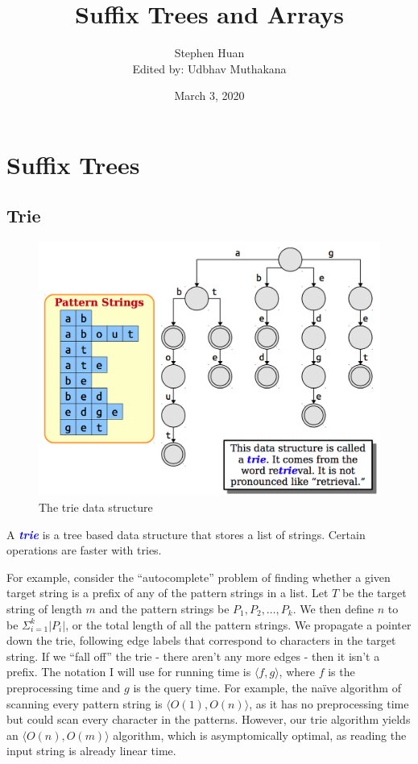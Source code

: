 \documentclass[11pt, oneside]{article}
\title{Suffix Trees and Arrays}
\author{Stephen Huan \\ Edited by: Udbhav Muthakana}
\date{March 3, 2020}
\newcommand{\emphasis}[1]{\textcolor{blue}{\textbf{\textit{#1}}}}
\begin{document}
\maketitle

\section{Suffix Trees}
\subsection{Trie}

\begin{figure}[h!]
\centering
\includegraphics[scale=0.25]{trie}
\caption{The trie data structure}
\end{figure}

A \emphasis{trie} is a tree based data structure that stores a list of strings.
Certain operations are faster with tries.

For example, consider the ``autocomplete'' problem of finding whether a given target string is a prefix of any of the pattern strings in a list.
Let \( T \) be the target string of length \( m \) and the pattern strings be \( P_1, P_2, \dots, P_k \).
We then define \( n \) to be \( \Sigma^{k}_{i = 1} |P_i| \), or the total length of all the pattern strings.
We propagate a pointer down the trie, following edge labels that correspond to characters in the target string.
If we ``fall off'' the trie - there aren't any more edges - then it isn't a prefix.
The notation I will use for running time is \( \langle f, g \rangle \),
where \( f \) is the preprocessing time and \( g \) is the query time.
For example, the naïve algorithm of scanning every pattern string
is \( \langle O(1), O(n) \rangle \), as it has no preprocessing time
but could scan every character in the patterns.
However, our trie algorithm yields an \( \langle O(n), O(m) \rangle \) algorithm,
which is asymptomically optimal, as reading the input string is already linear time.
\end{document}
